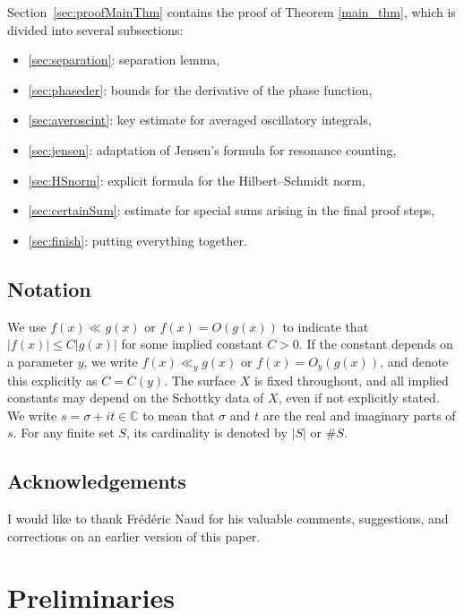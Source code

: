 \documentclass[12pt,letterpaper]{amsart}
\theoremstyle{plain}
\theoremstyle{definition}
\theoremstyle{remark}
\newcommand{\CC}{\mathbb{C}}
\begin{document}
Section~\ref{sec:proofMainThm} contains the proof of Theorem \ref{main_thm}, which is divided into several subsections:
\begin{itemize}
    \item \ref{sec:separation}: separation lemma,
    \item \ref{sec:phaseder}: bounds for the derivative of the phase function,
    \item \ref{sec:averoscint}: key estimate for averaged oscillatory integrals,
    \item \ref{sec:jensen}: adaptation of Jensen's formula for resonance counting,
    \item \ref{sec:HSnorm}: explicit formula for the Hilbert--Schmidt norm,
    \item \ref{sec:certainSum}: estimate for special sums arising in the final proof steps,
    \item \ref{sec:finish}: putting everything together.
\end{itemize}


\subsection{Notation}
We use $f(x) \ll g(x)$ or $f(x) = O(g(x))$ to indicate that $|f(x)| \le C|g(x)|$ for some implied constant $C > 0$. If the constant depends on a parameter $y$, we write $f(x) \ll_y g(x)$ or $f(x) = O_y(g(x))$, and denote this explicitly as $C = C(y)$. The surface $X$ is fixed throughout, and all implied constants may depend on the Schottky data of $X$, even if not explicitly stated. We write $s = \sigma + it \in \CC$ to mean that $\sigma$ and $t$ are the real and imaginary parts of $s$. For any finite set $S$, its cardinality is denoted by $|S|$ or $\#S$.

\subsection{Acknowledgements}
I would like to thank Fr\'{e}d\'{e}ric Naud for his valuable comments, suggestions, and corrections on an earlier version of this paper.

\section{Preliminaries}\label{sec:prelim}
\end{document}
